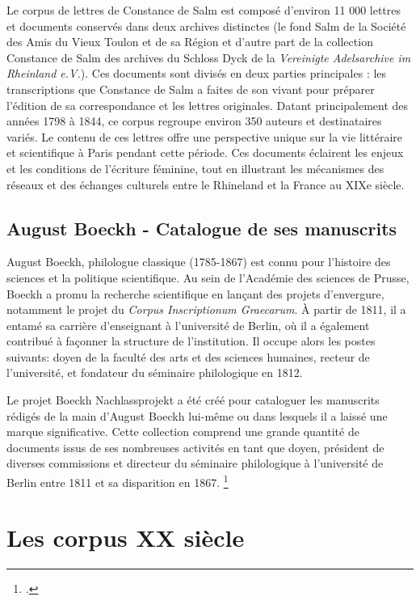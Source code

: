 Le corpus de lettres de Constance de Salm est composé d'environ 11 000 lettres et documents conservés dans deux archives distinctes (le fond \og{}Salm\fg{} de la Société des Amis du Vieux Toulon et de sa Région et d'autre part de la collection \og{}Constance de Salm\fg{} des archives du \og{}Schloss Dyck\fg{} de la \og{}\textit{Vereinigte Adelsarchive im Rheinland e.V.}\fg{}). Ces documents sont divisés en deux parties principales : les transcriptions que Constance de Salm a faites de son vivant pour préparer l'édition de sa correspondance et les lettres originales. Datant principalement des années 1798 à 1844, ce corpus regroupe environ 350 auteurs et destinataires variés. Le contenu de ces lettres offre une perspective unique sur la vie littéraire et scientifique à Paris pendant cette période. Ces documents éclairent les enjeux et les conditions de l'écriture féminine, tout en illustrant les mécanismes des réseaux et des échanges culturels entre le Rhineland et la France au XIXe siècle.

\subsection{August Boeckh - Catalogue de ses manuscrits}

August Boeckh, philologue classique (1785-1867) est connu pour l'histoire des sciences et la politique scientifique. Au sein de l'Académie des sciences de Prusse, Boeckh a promu la recherche scientifique en lançant des projets d'envergure, notamment le projet du \og{}\textit{Corpus Inscriptionum Graecarum}\fg{}. À partir de 1811, il a entamé sa carrière d'enseignant à l'université de Berlin, où il a également contribué à façonner la structure de l'institution. Il occupe alors les postes suivants: doyen de la faculté des arts et des sciences humaines, recteur de l'université, et fondateur du séminaire philologique en 1812.

Le projet Boeckh Nachlassprojekt a été créé pour cataloguer les manuscrits rédigés de la main d'August Boeckh lui-même ou dans lesquels il a laissé une marque significative. Cette collection comprend une grande quantité de documents issus de ses nombreuses activités en tant que doyen, président de diverses commissions et directeur du séminaire philologique à l'université de Berlin entre 1811 et sa disparition en 1867. \footcite{DiScholEdBerlinintellectualsCorrespondences}

\section{Les corpus XX siècle}

